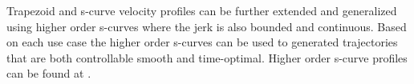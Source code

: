 Trapezoid and s-curve velocity profiles can be further extended and generalized using higher order s-curves where the jerk is also bounded and continuous. Based on each use case the higher order s-curves can be used to 
generated trajectories that are both controllable smooth and time-optimal. Higher order s-curve profiles can be found at \cite{Nguyen2008HigherOrderSCurves}.
